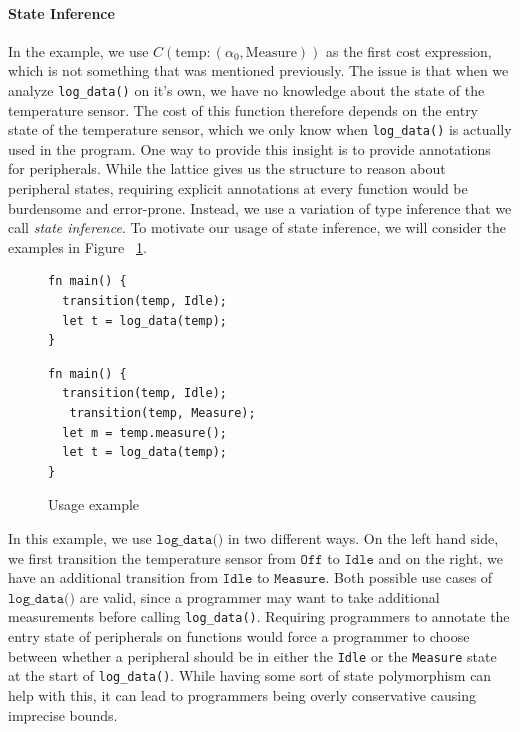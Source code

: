 \documentclass[sigconf, nonacm, screen]{acmart}
\begin{document}
\paragraph{State Inference} In the example, we use $C(\text{temp}: (\alpha_0, \text{Measure}))$ as the first cost expression, which is not something that was mentioned previously. The issue is that when we analyze \texttt{log\_data()} on it's own, we have no knowledge about the state of the temperature sensor. The cost of this function therefore depends on the entry state of the temperature sensor, which we only know when \texttt{log\_data()} is actually used in the program. One way to provide this insight is to provide annotations for peripherals. While the lattice gives us the structure to reason about peripheral states, requiring explicit annotations at every function would be burdensome and error-prone. Instead, we use a variation of type inference that we call \textit{state inference}. To motivate our usage of state inference, we will consider the examples in Figure ~\ref{fig:usage_example}. 

\begin{figure}[h]
\small
    \centering
    \begin{minipage}{0.45\linewidth}
\begin{verbatim}
fn main() {
  transition(temp, Idle);
  let t = log_data(temp);
}
\end{verbatim}
    \end{minipage}
    \hfill
\begin{minipage}{0.45\linewidth}
\begin{verbatim}
fn main() {
  transition(temp, Idle);
   transition(temp, Measure);
  let m = temp.measure();
  let t = log_data(temp);
}
\end{verbatim}
\end{minipage}
\vspace{-6pt}
    \caption{Usage example}
\label{fig:usage_example}
\end{figure}

In this example, we use $\texttt{log\_data()}$ in two different ways. On the left hand side, we first transition the temperature sensor from $\texttt{Off}$ to $\texttt{Idle}$ and on the right, we have an additional transition from $\texttt{Idle}$ to $\texttt{Measure}$. Both possible use cases of $\texttt{log\_data()}$ are valid, since a programmer may want to take additional measurements before calling  \texttt{log\_data()}. Requiring programmers to annotate the entry state of peripherals on functions would force a programmer to choose between whether a peripheral should be in either the \texttt{Idle} or the \texttt{Measure} state at the start of \texttt{log\_data()}. While having some sort of state polymorphism can help with this, it can lead to programmers being overly conservative causing imprecise bounds.
\end{document}

